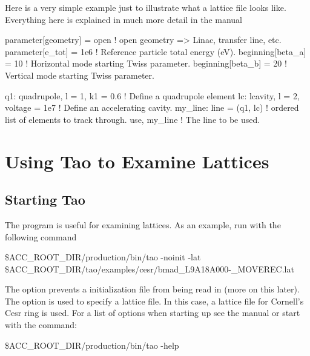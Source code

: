 \documentclass{report}
\begin{document}
Here is a very simple example just to illustrate what a lattice file looks
like. Everything here is explained in much more detail in the \bmad manual
\begin{example}
  parameter[geometry] = open     ! open geometry => Linac, transfer line, etc.
  parameter[e_tot] = 1e6         ! Reference particle total energy (eV).
  beginning[beta_a] = 10         ! Horizontal mode starting Twiss parameter.
  beginning[beta_b] = 20         ! Vertical mode starting Twiss parameter.

  q1: quadrupole, l = 1, k1 = 0.6   ! Define a quadrupole element
  lc: lcavity, l = 2, voltage = 1e7 ! Define an accelerating cavity.
  my_line: line = (q1, lc)          ! ordered list of elements to track through.
  use, my_line                      ! The line to be used.
\end{example}

\section{Using Tao to Examine Lattices}

\subsection{Starting Tao}

The  program is useful for examining lattices. As an example, run  with
the following command
\begin{example}
  \$ACC_ROOT_DIR/production/bin/tao -noinit -lat \B
              \$ACC_ROOT_DIR/tao/examples/cesr/bmad_L9A18A000-_MOVEREC.lat
\end{example}
The  option prevents a  initialization file from being read in (more
on this later). The  option is used to specify a lattice file. In this case,
a lattice file for Cornell's Cesr ring is used. For a list of options when starting
up  see the  manual or start  with the command:
\begin{example}
  \$ACC_ROOT_DIR/production/bin/tao -help
\end{example}
\end{document}
